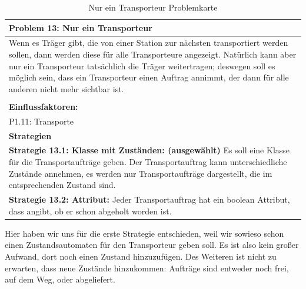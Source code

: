 \documentclass[enabledeprecatedfontcommands,fontsize=12pt,paper=a4,twoside]{scrartcl}
\begin{document}
\begin{table}[H]
    \centering
    \begin{tabular}{|p{15cm}|}
    \hline
          \textbf{Problem 13:} Nur ein Transporteur
          \\ \hline
          Wenn es Träger gibt, die von einer Station zur nächsten transportiert werden sollen, dann werden diese für alle Transporteure angezeigt. Natürlich kann aber nur ein Transporteur tatsächlich die Träger weitertragen; deswegen soll es möglich sein, dass ein Transporteur einen Auftrag annimmt, der dann für alle anderen nicht mehr sichtbar ist. \\
        \\  \hline
        \textbf{Einflussfaktoren: } \\
	 P1.11: Transporte \\ 
        \hline
        \textbf{Strategien} \\
         \textbf{Strategie 13.1: Klasse mit Zuständen: (ausgewählt)} Es soll eine Klasse für die Transportaufträge geben. Der Transportauftrag kann unterschiedliche Zustände annehmen, es werden nur Transportaufträge dargestellt, die im entsprechenden Zustand sind. \\
	\textbf{Strategie 13.2: Attribut:} Jeder Transportauftrag hat ein boolean Attribut, dass angibt, ob er schon abgeholt worden ist. \\  \hline
    \end{tabular}
    \caption{Nur ein Transporteur Problemkarte}
    \label{tab:ProblemKarte13}
\end{table}
Hier haben wir uns für die erste Strategie entschieden, weil wir sowieso schon einen Zustandsautomaten für den Transporteur geben soll. Es ist also kein großer Aufwand, dort noch einen Zustand hinzuzufügen. Des Weiteren ist nicht zu erwarten, dass neue Zustände hinzukommen: Aufträge sind entweder noch frei, auf dem Weg, oder abgeliefert. \\
\end{document}
